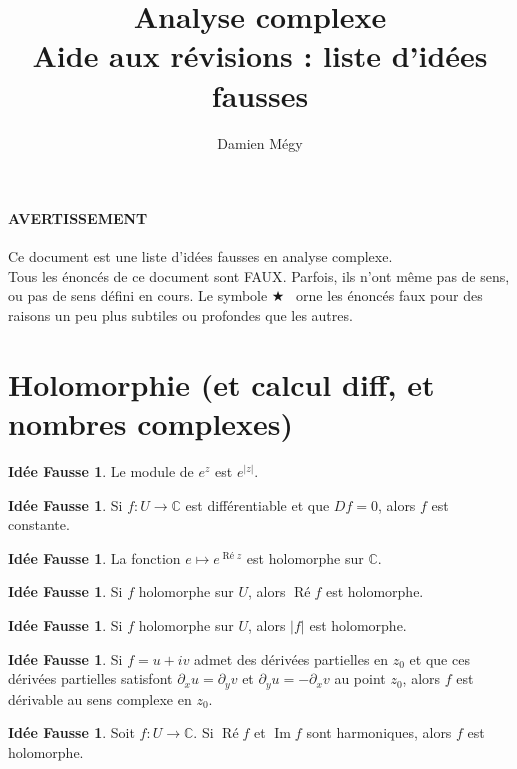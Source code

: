 \documentclass[11pt,a4paper]{article}
\title{Analyse complexe\\ Aide aux révisions : liste d'idées fausses}
\author{Damien Mégy}
\newcommand{\C}{\mathbb{C}}
\DeclareMathOperator{\PR}{\text{Ré}}
\DeclareMathOperator{\PI}{\text{Im}}
\theoremstyle{definition}
\newtheorem{ideeFausse}[theoreme]{Idée Fausse}
\theoremstyle{plain}
\newcommand{\important}{$\bigstar$~}
\begin{document}
\maketitle
\tableofcontents

\bigskip
\paragraph{AVERTISSEMENT}
Ce document est une liste d'idées fausses en analyse complexe.\\

Tous les énoncés de ce document sont {\Large FAUX}. Parfois, ils n'ont même pas de sens, ou pas de sens défini en cours.
Le symbole \og\important\fg{} orne les énoncés faux pour des raisons un peu plus subtiles ou profondes que les autres.

\section{Holomorphie (et calcul diff, et nombres complexes)}

\begin{ideeFausse}
Le module de $e^z$ est $e^{|z|}$.
\end{ideeFausse}

\begin{ideeFausse}
Si $f : U\to \C$ est différentiable et que $Df=0$, alors $f$ est constante.
\end{ideeFausse}

\begin{ideeFausse}
La fonction $e\mapsto e^{\PR z}$ est holomorphe sur $\C$.
\end{ideeFausse}

\begin{ideeFausse}
Si $f$ holomorphe sur $U$, alors $\PR f$ est holomorphe.
\end{ideeFausse}

\begin{ideeFausse}
Si $f$ holomorphe sur $U$, alors $|f|$ est holomorphe.
\end{ideeFausse}

\begin{ideeFausse}
Si $f=u+iv$ admet des dérivées partielles en $z_0$ et que ces dérivées partielles satisfont $\partial_x u = \partial_y v$ et $\partial_y u = -\partial_x v$ au point $z_0$, alors $f$ est dérivable au sens complexe en $z_0$.
\end{ideeFausse}

\begin{ideeFausse}
Soit $f : U\to \C$. Si $\PR f$ et $\PI f$ sont harmoniques, alors $f$ est holomorphe.
\end{ideeFausse}
\end{document}
